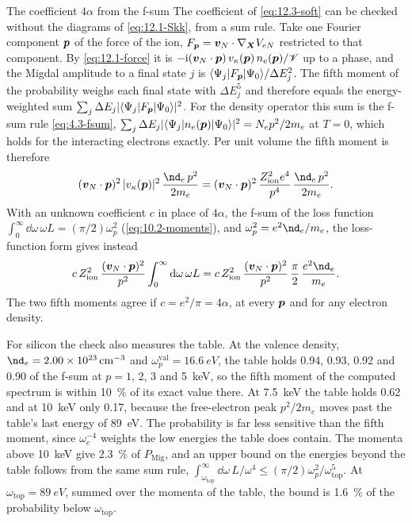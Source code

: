 \begin{workedexample}{The coefficient $4\alpha$ from the f-sum}\label{we:12-fsum}
The coefficient of \cref{eq:12.3-soft} can be checked without the diagrams of \cref{eq:12.1-Skk}, from a sum rule. Take one Fourier component $\bm{p}$ of the force of the ion, $F_{\bm{p}} = \bm{v}_N\cdot\nabla_{\bm{X}}V_{eN}$ restricted to that component. By \cref{eq:12.1-force} it is $-\mathrm{i}(\bm{v}_N\cdot\bm{p})\,v_\kappa(\bm{p})\,n_e(\bm{p})/\mathscr{V}$ up to a phase, and the Migdal amplitude to a final state $j$ is $\langle\Psi_j|F_{\bm{p}}|\Psi_0\rangle/\Delta E_j^2$. The fifth moment of the probability weighs each final state with $\Delta E_j^5$ and therefore equals the energy-weighted sum $\sum_j\Delta E_j|\langle\Psi_j|F_{\bm{p}}|\Psi_0\rangle|^2$. For the density operator this sum is the f-sum rule \cref{eq:4.3-fsum}, $\sum_j\Delta E_j|\langle\Psi_j|n_e(\bm{p})|\Psi_0\rangle|^2 = N_ep^2/2m_e$ at $T = 0$, which holds for the interacting electrons exactly. Per unit volume the fifth moment is therefore
\begin{equation*}
  (\vect{v}_N\cdot\vect{p})^2\,|v_\kappa(\vect{p})|^2\,\frac{\nd_e\,p^2}{2m_e} = (\vect{v}_N\cdot\vect{p})^2\,\frac{Z_{\mathrm{ion}}^2e^4}{p^4}\,\frac{\nd_e\,p^2}{2m_e} .
\end{equation*}
With an unknown coefficient $c$ in place of $4\alpha$, the f-sum of the loss function $\int_0^\infty\dd\omega\,\omega L = (\pi/2)\omega_p^2$ (\cref{eq:10.2-moments}), and $\omega_p^2 = e^2\nd_e/m_e$, the loss-function form gives instead
\begin{equation*}
  c\,Z_{\mathrm{ion}}^2\,\frac{(\vect{v}_N\cdot\vect{p})^2}{p^2}\int_0^\infty\dd\omega\,\omega L = c\,Z_{\mathrm{ion}}^2\,\frac{(\vect{v}_N\cdot\vect{p})^2}{p^2}\,\frac{\pi}{2}\,\frac{e^2\nd_e}{m_e} .
\end{equation*}
The two fifth moments agree if $c = e^2/\pi = 4\alpha$, at every $\bm{p}$ and for any electron density.

For silicon the check also measures the table. At the valence density, $\nd_e = \SI{2.00e23}{cm^{-3}}$ and $\omega_p^{\mathrm{val}} = \SI{16.6}{eV}$, the table holds 0.94, 0.93, 0.92 and 0.90 of the f-sum at $p = 1$, 2, 3 and \SI{5}{keV}, so the fifth moment of the computed spectrum is within \SI{10}{\percent} of its exact value there. At \SI{7.5}{keV} the table holds 0.62 and at \SI{10}{keV} only 0.17, because the free-electron peak $p^2/2m_e$ moves past the table's last energy of \SI{89}{eV}. The probability is far less sensitive than the fifth moment, since $\omega_e^{-4}$ weights the low energies the table does contain. The momenta above \SI{10}{keV} give \SI{2.3}{\percent} of $P_{\mathrm{Mig}}$, and an upper bound on the energies beyond the table follows from the same sum rule, $\int_{\omega_{\mathrm{top}}}^\infty\dd\omega\,L/\omega^4 \le (\pi/2)\omega_p^2/\omega_{\mathrm{top}}^5$. At $\omega_{\mathrm{top}} = \SI{89}{eV}$, summed over the momenta of the table, the bound is \SI{1.6}{\percent} of the probability below $\omega_{\mathrm{top}}$.
\end{workedexample}

